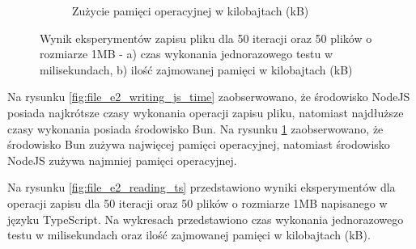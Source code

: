 \begin{figure}[H]
\begin{subfigure}[b]{0.42\textwidth}
    \caption{Zużycie pamięci operacyjnej w kilobajtach (kB)}
    \label{fig:file_e2_writing_js_memory}
  \end{subfigure}
  \caption{Wynik eksperymentów zapisu pliku dla 50 iteracji oraz 50 plików o rozmiarze 1MB - a) czas wykonania jednorazowego testu w milisekundach, b) ilość zajmowanej pamięci w kilobajtach (kB)}
  \label{fig:file_e2_writing_js}
\end{figure}

Na rysunku \ref{fig:file_e2_writing_js_time} zaobserwowano, że środowisko NodeJS posiada najkrótsze czasy wykonania operacji zapisu pliku, natomiast najdłuższe czasy wykonania posiada środowisko Bun. Na rysunku \ref{fig:file_e2_writing_js_memory} zaobserwowano, że środowisko Bun zużywa najwięcej pamięci operacyjnej, natomiast środowisko NodeJS zużywa najmniej pamięci operacyjnej.

Na rysunku \ref{fig:file_e2_reading_ts} przedstawiono wyniki eksperymentów dla operacji zapisu dla 50 iteracji oraz 50 plików o rozmiarze 1MB napisanego w języku TypeScript. Na wykresach przedstawiono czas wykonania jednorazowego testu w milisekundach oraz ilość zajmowanej pamięci w kilobajtach (kB).


